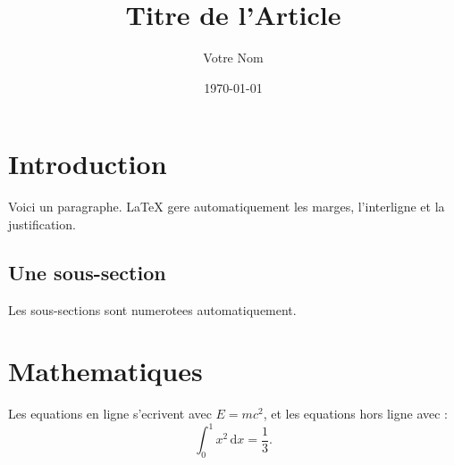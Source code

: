 \documentclass{article}  %
\begin{document}
\title{Titre de l'Article}
\author{Votre Nom}
\date{\today}  %
\maketitle  %

\section{Introduction}
Voici un paragraphe. LaTeX gere automatiquement les marges, l'interligne et la justification.

\subsection{Une sous-section}
Les sous-sections sont numerotees automatiquement.

\section{Mathematiques}
Les equations en ligne s'ecrivent avec \(E=mc^2\), et les equations hors ligne avec :
\[
\int_0^1 x^2 \, \mathrm{d}x = \frac{1}{3}.
\]
\end{document}

